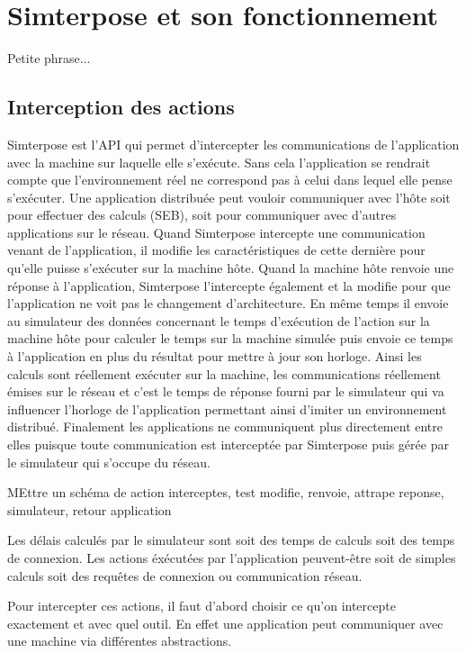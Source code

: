 \section{Simterpose et son fonctionnement}
Petite phrase...
\subsection{Interception des actions}
Simterpose est l'API qui permet d'intercepter les communications de
l'application avec la machine sur laquelle elle s'exécute. Sans cela
l'application se rendrait compte que l'environnement réel ne correspond pas à
celui dans lequel elle pense s'exécuter. Une application distribuée peut vouloir
communiquer avec l'hôte soit pour effectuer des calculs (SEB), soit pour
communiquer avec d'autres applications sur le réseau. Quand Simterpose
intercepte une communication venant de l'application, il modifie les
caractéristiques de cette dernière pour qu'elle puisse s'exécuter sur la machine
hôte. Quand la machine hôte renvoie une réponse à l'application, Simterpose
l'intercepte également et la modifie pour que l'application ne voit pas le
changement d'architecture. En même temps il envoie au simulateur des données
concernant le temps d'exécution de l'action sur la machine hôte pour calculer le
temps sur la machine simulée puis envoie ce temps à l'application en plus du
résultat pour mettre à jour son horloge. Ainsi les calculs sont réellement
exécuter sur la machine, les communications réellement émises sur le réseau et c'est le temps de réponse fourni par le simulateur qui va influencer l'horloge de l'application permettant ainsi d'imiter un environnement distribué. Finalement les applications ne communiquent plus directement entre elles puisque toute communication est interceptée par Simterpose puis gérée par le simulateur qui s'occupe du réseau. 

{\color{red} MEttre un schéma de action interceptes, test modifie, renvoie,
  attrape reponse, simulateur, retour application}

Les délais calculés par le simulateur sont soit des temps de calculs soit des
temps de connexion. Les actions éxécutées par l'application peuvent-être soit
de simples calculs soit des requêtes de connexion ou communication réseau.

Pour intercepter ces actions, il faut d'abord choisir ce qu'on intercepte
exactement et avec quel outil. En effet une application peut communiquer avec
une machine via différentes abstractions.

